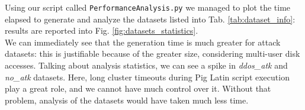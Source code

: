 Using our script called \texttt{PerformanceAnalysis.py} we managed to plot the time elapsed to generate and analyze the datasets listed into Tab. \ref{tab:dataset_info}: results are reported into Fig. \ref{fig:datasets_statistics}. \\
We can immediately see that the generation time is much greater for attack datasets: this is justifiable because of the greater size, considering multi-user disk accesses.
Talking about analysis statistics, we can see a spike in \textit{ddos\_atk} and \textit{no\_atk} datasets. Here, long cluster timeouts during Pig Latin script execution play a great role, and we cannot have much control over it. Without that problem, analysis of the datasets would have taken much less time.


